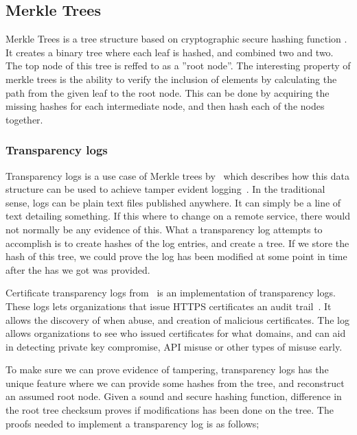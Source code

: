 \documentclass[../Main/thesis.tex]{subfiles}
\begin{document}
\subsection{Merkle Trees}%
\label{sec:merkle_trees}
Merkle Trees is a tree structure based on cryptographic secure hashing function
\cite{ralph-c.-merkle-1998}. It creates a binary tree where each leaf is hashed,
and combined two and two. The top node of this tree is reffed to as a ''root
node''. The interesting property of merkle trees is the ability to verify the
inclusion of elements by calculating the path from the given leaf to the root
node. This can be done by acquiring the missing hashes for each intermediate
node, and then hash each of the nodes together.

\subsubsection*{Transparency logs}%
\label{sub:certificate_transparency_log}
Transparency logs is a use case of Merkle trees by~\citeauthor{182788} which
describes how this data structure can be used to achieve tamper evident
logging~\cite{182788}. In the traditional sense, logs can be plain text files
published anywhere. It can simply be a line of text detailing something. If this
where to change on a remote service, there would not normally be any evidence of
this. What a transparency log attempts to accomplish is to create hashes of the
log entries, and create a tree. If we store the hash of this tree, we could
prove the log has been modified at some point in time after the has we got was
provided. 

Certificate transparency logs
from~\citeauthor{b.-laurie-a.-langley-e.kaster-google-2013} is an implementation
of transparency logs. These logs lets organizations that issue HTTPS
certificates an audit trail~\cite{b.-laurie-a.-langley-e.kaster-google-2013}.
It allows the discovery of when abuse, and creation of malicious certificates.
The log allows organizations to see who issued certificates for what domains,
and can aid in detecting private key compromise, API misuse or other types of
misuse early.

To make sure we can prove evidence of tampering, transparency logs has the
unique feature where we can provide some hashes from the tree, and reconstruct
an assumed root node. Given a sound and secure hashing function, difference in
the root tree checksum proves if modifications has been done on the tree.  The
proofs needed to implement a transparency log is as follows;
\end{document}
